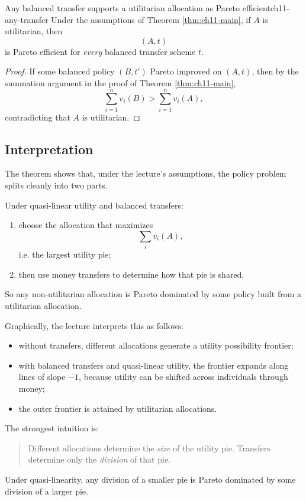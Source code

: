 \begin{theorem}{Any balanced transfer supports a utilitarian allocation as Pareto efficient}{ch11-any-transfer}
Under the assumptions of Theorem \ref{thm:ch11-main}, if $A$ is utilitarian, then
\[
(A,t)
\]
is Pareto efficient for \emph{every} balanced transfer scheme $t$.
\end{theorem}

\begin{proof}
If some balanced policy $(B,t')$ Pareto improved on $(A,t)$, then by the summation argument in the proof of Theorem \ref{thm:ch11-main},
\[
\sum_{i=1}^n v_i(B) > \sum_{i=1}^n v_i(A),
\]
contradicting that $A$ is utilitarian.
\end{proof}

\subsection{Interpretation}

The theorem shows that, under the lecture's assumptions, the policy problem splits cleanly into two parts.

\begin{policynote}[title={Policy Interpretation: Efficiency then distribution}]
Under quasi-linear utility and balanced transfers:
\begin{enumerate}
    \item choose the allocation that maximizes
    \[
    \sum_i v_i(A),
    \]
    i.e. the largest utility pie;
    \item then use money transfers to determine how that pie is shared.
\end{enumerate}
So any non-utilitarian allocation is Pareto dominated by some policy built from a utilitarian allocation.
\end{policynote}

Graphically, the lecture interprets this as follows:
\begin{itemize}
    \item without transfers, different allocations generate a utility possibility frontier;
    \item with balanced transfers and quasi-linear utility, the frontier expands along lines of slope $-1$, because utility can be shifted across individuals through money;
    \item the outer frontier is attained by utilitarian allocations.
\end{itemize}

\begin{examtip}
The strongest intuition is:
\begin{quote}
Different allocations determine the \emph{size} of the utility pie. Transfers determine only the \emph{division} of that pie.
\end{quote}
Under quasi-linearity, any division of a smaller pie is Pareto dominated by some division of a larger pie.
\end{examtip}

